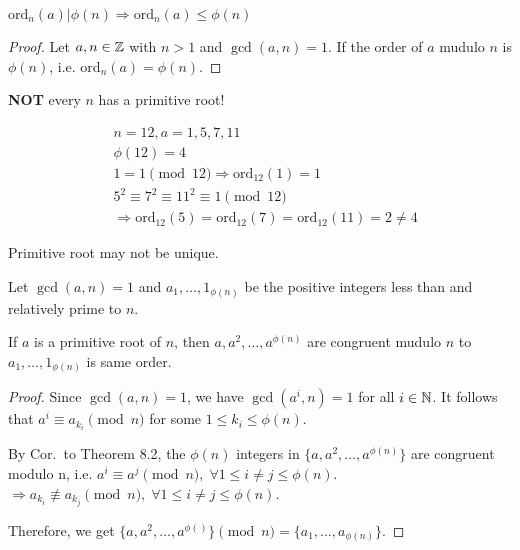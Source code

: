 
\begin{theorem}
    $\text{ord}_{n}(a) | \phi(n) \Rightarrow \text{ord}_{n}(a) \leq \phi(n)$ 
\end{theorem}
\begin{proof}
    Let $a, n \in \mathbb{Z}$ with $n > 1$ and $\gcd(a, n) = 1$. If the order of $a$ mudulo $n$ is $\phi(n)$, i.e.
    $\text{ord}_{n}(a) = \phi(n)$.
\end{proof}


\begin{remark}
    \textbf{NOT} every $n$ has a primitive root!
\end{remark}
\begin{eg}
    \[
        \begin{aligned}        
            & n=12, a=1, 5, 7, 11 \\
            & \phi(12) = 4 \\
            & 1 = 1 \pmod {12} \Rightarrow \text{ord}_{12}(1) = 1 \\
            & 5^2 \equiv 7^2 \equiv 11^2 \equiv 1 \pmod {12} \\
            & \Rightarrow \text{ord}_{12}(5) = \text{ord}_{12}(7) = \text{ord}_{12}(11) = 2 \neq 4
        \end{aligned}
    \]
\end{eg}
\begin{remark}
    Primitive root may not be unique.
\end{remark}


\begin{theorem}
    Let $\gcd(a, n) = 1$ and $a_1, \dots, 1_{\phi(n)}$ be the positive
    integers less than and relatively prime to $n$.

    If $a$ is a primitive root of $n$, then $a, a^2, \dots, a^{\phi(n)}$
    are congruent mudulo $n$ to $a_1, \dots, 1_{\phi(n)}$ is same order.
\end{theorem}
\begin{proof}
    Since $\gcd(a, n) = 1$, we have $\gcd(a^i, n) = 1$ for all $i \in \mathbb{N}$.
    It follows that $a^i \equiv a_{k_i} \pmod n$ for some $1 \leq k_i \leq \phi(n)$.

    By Cor.\ to Theorem 8.2, the $\phi(n)$ integers in $\{a, a^2, \dots, a^{\phi(n)}\}$
    are congruent modulo n, i.e. $a^i \equiv a^j \pmod n, \; \forall 1 \leq i \neq j \leq \phi(n)$.
    $\Rightarrow a_{k_i} \not \equiv a_{k_j} \pmod n,\; \forall 1 \leq i \neq j \leq \phi(n)$.

    Therefore, we get $\{a, a^2, \dots, a^{\phi()}\} \pmod n = \{a_1, \dots, a_{\phi(n)}\}$.
\end{proof}

